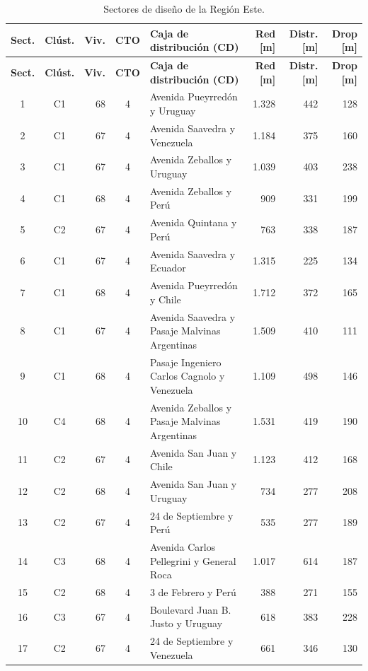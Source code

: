 \footnotesize\setlength{\tabcolsep}{4pt}\begin{longtable}{|c|c|r|c|p{4.2cm}|r|r|r|}
\caption{Sectores de diseño de la Región Este.}\label{tab:sectores}\\ \hline
\textbf{Sect.} & \textbf{Clúst.} & \textbf{Viv.} & \textbf{CTO} & \textbf{Caja de distribución (CD)} & \textbf{Red [m]} & \textbf{Distr. [m]} & \textbf{Drop [m]} \\ \hline \endfirsthead
\hline \textbf{Sect.} & \textbf{Clúst.} & \textbf{Viv.} & \textbf{CTO} & \textbf{Caja de distribución (CD)} & \textbf{Red [m]} & \textbf{Distr. [m]} & \textbf{Drop [m]} \\ \hline \endhead
1 & C1 & 68 & 4 & Avenida Pueyrredón y Uruguay & 1.328 & 442 & 128 \\ \hline
2 & C1 & 67 & 4 & Avenida Saavedra y Venezuela & 1.184 & 375 & 160 \\ \hline
3 & C1 & 67 & 4 & Avenida Zeballos y Uruguay & 1.039 & 403 & 238 \\ \hline
4 & C1 & 68 & 4 & Avenida Zeballos y Perú & 909 & 331 & 199 \\ \hline
5 & C2 & 67 & 4 & Avenida Quintana y Perú & 763 & 338 & 187 \\ \hline
6 & C1 & 67 & 4 & Avenida Saavedra y Ecuador & 1.315 & 225 & 134 \\ \hline
7 & C1 & 68 & 4 & Avenida Pueyrredón y Chile & 1.712 & 372 & 165 \\ \hline
8 & C1 & 67 & 4 & Avenida Saavedra y Pasaje Malvinas Argentinas & 1.509 & 410 & 111 \\ \hline
9 & C1 & 68 & 4 & Pasaje Ingeniero Carlos Cagnolo y Venezuela & 1.109 & 498 & 146 \\ \hline
10 & C4 & 68 & 4 & Avenida Zeballos y Pasaje Malvinas Argentinas & 1.531 & 419 & 190 \\ \hline
11 & C2 & 67 & 4 & Avenida San Juan y Chile & 1.123 & 412 & 168 \\ \hline
12 & C2 & 68 & 4 & Avenida San Juan y Uruguay & 734 & 277 & 208 \\ \hline
13 & C2 & 67 & 4 & 24 de Septiembre y Perú & 535 & 277 & 189 \\ \hline
14 & C3 & 68 & 4 & Avenida Carlos Pellegrini y General Roca & 1.017 & 614 & 187 \\ \hline
15 & C2 & 68 & 4 & 3 de Febrero y Perú & 388 & 271 & 155 \\ \hline
16 & C3 & 67 & 4 & Boulevard Juan B. Justo y Uruguay & 618 & 383 & 228 \\ \hline
17 & C2 & 67 & 4 & 24 de Septiembre y Venezuela & 661 & 346 & 130 \\ \hline

\end{longtable}

